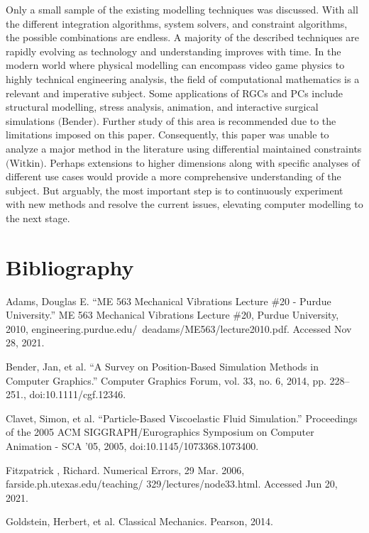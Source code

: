 \documentclass[12pt, letterpaper]{article}
\begin{document}
Only a small sample of the existing modelling techniques was discussed. With all the different integration algorithms, system solvers, and constraint algorithms, the possible combinations are endless. A majority of the described techniques are rapidly evolving as technology and understanding improves with time. In the modern world where physical modelling can encompass video game physics to highly technical engineering analysis, the field of computational mathematics is a relevant and imperative subject. Some applications of RGCs and PCs include structural modelling, stress analysis, animation, and interactive surgical simulations $\text{(Bender)}$. Further study of this area is recommended due to the limitations imposed on this paper. Consequently, this paper was unable to analyze a major method in the literature using differential maintained constraints $\text{(Witkin)}$. Perhaps extensions to higher dimensions along with specific analyses of different use cases would  provide a more comprehensive understanding of the subject. But arguably, the most important step is to continuously experiment with new methods and resolve the current issues, elevating computer modelling to the next stage.
\clearpage

\section{Bibliography}
\noindent
\vspace{-2em}
\setlength{\parindent}{-0.5in}
\setlength{\leftskip}{0.5in}

Adams, Douglas E. “ME 563 Mechanical Vibrations Lecture \#20 - Purdue University.” ME 563 Mechanical Vibrations Lecture \#20, Purdue University, 2010, engineering.purdue.edu/~deadams/ME563/lecture2010.pdf. Accessed Nov 28, 2021.

Bender, Jan, et al. “A Survey on Position-Based Simulation Methods in Computer Graphics.” Computer Graphics Forum, vol. 33, no. 6, 2014, pp. 228–251., doi:10.1111/cgf.12346.

Clavet, Simon, et al. “Particle-Based Viscoelastic Fluid Simulation.” Proceedings of the 2005 ACM SIGGRAPH/Eurographics Symposium on Computer Animation - SCA '05, 2005, doi:10.1145/1073368.1073400.

Fitzpatrick , Richard. Numerical Errors, 29 Mar. 2006, farside.ph.utexas.edu/teaching/ 329/lectures/node33.html. Accessed Jun 20, 2021.

Goldstein, Herbert, et al. Classical Mechanics. Pearson, 2014. 
\end{document}

